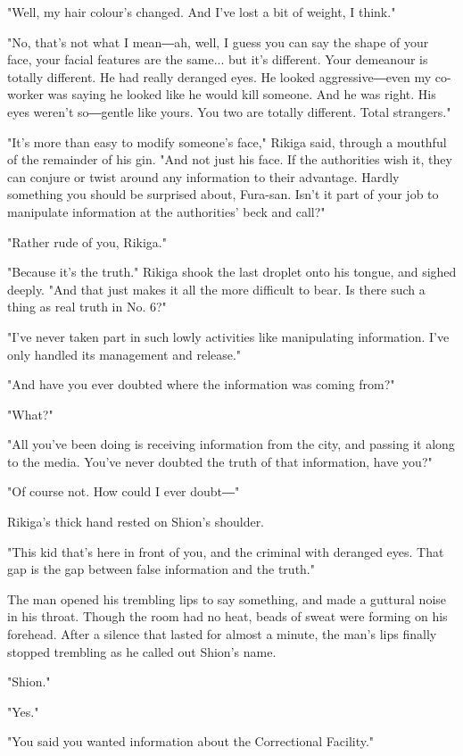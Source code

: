 "Well, my hair colour's changed. And I've lost a bit of weight, I
think."

"No, that's not what I mean―ah, well, I guess you can say the shape of
your face, your facial features are the same... but it's different. Your
demeanour is totally different. He had really deranged eyes. He looked
aggressive―even my co-worker was saying he looked like he would kill
someone. And he was right. His eyes weren't so―gentle like yours. You
two are totally different. Total strangers."

"It's more than easy to modify someone's face," Rikiga said, through a
mouthful of the remainder of his gin. "And not just his face. If the
authorities wish it, they can conjure or twist around any information to
their advantage. Hardly something you should be surprised about,
Fura-san. Isn't it part of your job to manipulate information at the
authorities' beck and call?"

"Rather rude of you, Rikiga."

"Because it's the truth." Rikiga shook the last droplet onto his tongue,
and sighed deeply. "And that just makes it all the more difficult to
bear. Is there such a thing as real truth in No. 6?"

"I've never taken part in such lowly activities like manipulating
information. I've only handled its management and release."

"And have you ever doubted where the information was coming from?"

"What?"

"All you've been doing is receiving information from the city, and
passing it along to the media. You've never doubted the truth of that
information, have you?"

"Of course not. How could I ever doubt―"

Rikiga's thick hand rested on Shion's shoulder.

"This kid that's here in front of you, and the criminal with deranged
eyes. That gap is the gap between false information and the truth."

The man opened his trembling lips to say something, and made a guttural
noise in his throat. Though the room had no heat, beads of sweat were
forming on his forehead. After a silence that lasted for almost a
minute, the man's lips finally stopped trembling as he called out
Shion's name.

"Shion."

"Yes."

"You said you wanted information about the Correctional Facility."

